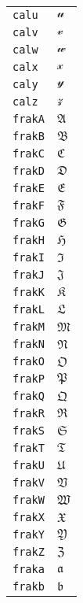 \begin{longtable}{ll}
\texttt{calu}&${}\mathcal{u}{}$\\
\texttt{calv}&${}\mathcal{v}{}$\\
\texttt{calw}&${}\mathcal{w}{}$\\
\texttt{calx}&${}\mathcal{x}{}$\\
\texttt{caly}&${}\mathcal{y}{}$\\
\texttt{calz}&${}\mathcal{z}{}$\\
\texttt{frakA}&${}\mathfrak{A} {}$\\
\texttt{frakB}&${}\mathfrak{B} {}$\\
\texttt{frakC}&${}\mathfrak{C} {}$\\
\texttt{frakD}&${}\mathfrak{D} {}$\\
\texttt{frakE}&${}\mathfrak{E} {}$\\
\texttt{frakF}&${}\mathfrak{F} {}$\\
\texttt{frakG}&${}\mathfrak{G} {}$\\
\texttt{frakH}&${}\mathfrak{H} {}$\\
\texttt{frakI}&${}\mathfrak{I} {}$\\
\texttt{frakJ}&${}\mathfrak{J} {}$\\
\texttt{frakK}&${}\mathfrak{K} {}$\\
\texttt{frakL}&${}\mathfrak{L} {}$\\
\texttt{frakM}&${}\mathfrak{M} {}$\\
\texttt{frakN}&${}\mathfrak{N} {}$\\
\texttt{frakO}&${}\mathfrak{O} {}$\\
\texttt{frakP}&${}\mathfrak{P} {}$\\
\texttt{frakQ}&${}\mathfrak{Q} {}$\\
\texttt{frakR}&${}\mathfrak{R} {}$\\
\texttt{frakS}&${}\mathfrak{S} {}$\\
\texttt{frakT}&${}\mathfrak{T} {}$\\
\texttt{frakU}&${}\mathfrak{U} {}$\\
\texttt{frakV}&${}\mathfrak{V} {}$\\
\texttt{frakW}&${}\mathfrak{W} {}$\\
\texttt{frakX}&${}\mathfrak{X} {}$\\
\texttt{frakY}&${}\mathfrak{Y} {}$\\
\texttt{frakZ}&${}\mathfrak{Z} {}$\\
\texttt{fraka}&${}\mathfrak{a} {}$\\
\texttt{frakb}&${}\mathfrak{b} {}$\\

\end{longtable}
